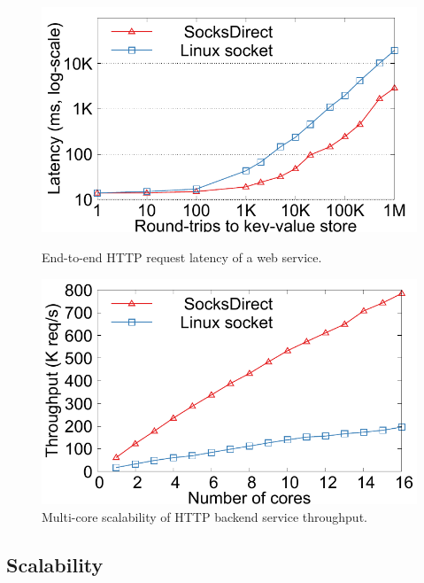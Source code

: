 \begin{figure}[t!]
\begin{minipage}{.31\textwidth}
		\centering \includegraphics[width=\textwidth]{eval/microbenchmark/nginx-multiround-tput.pdf}
		\vspace{-15pt}
		\caption{End-to-end HTTP request latency of a web service.}
		\label{fig:eval-nginx-multiround}
		
		\centering
		\includegraphics[width=\textwidth]{eval/microbenchmark/corenum-http-tput.pdf}
		\vspace{-15pt}
		\caption{Multi-core scalability of HTTP backend service throughput.}
		\label{fig:eval-http-tput}
	\end{minipage}
\end{figure}

\subsection{Scalability}


